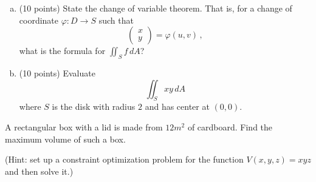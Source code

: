 \documentclass[12pt]{article}
\begin{document}
\newpage
\begin{problem}
    \begin{enumerate}[(a)]
        \item (10 points) State the change of variable theorem. That is, for a change of coordinate
        $\varphi: D \to S$ such that
        \begin{equation*}
            \begin{pmatrix}
                x \\ y
            \end{pmatrix}
            = \varphi(u,v) \,,
        \end{equation*}
        what is the formula for 
        $\iint_S f \, dA$?
    \item (10 points) Evaluate
        \begin{equation*}
            \iint_S xy \, dA
        \end{equation*}
        where $S$ is the disk with radius $2$ and has center at $(0,0)$.
        
\end{enumerate}
\end{problem}



\newpage

\begin{problem}
    A rectangular box with a lid is made from $12 m^2$ of cardboard.
    Find the maximum volume of such a box.

    (Hint: set up a constraint optimization problem for the function $V(x,y,z) = xyz$ 
    and then solve it.)
\end{problem}
%
\end{document}

